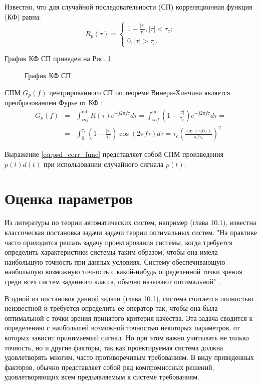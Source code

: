 Известно, что для случайной последовательности (СП) корреляционная функция (КФ) равна:
\begin{equation}
	\label{eq:cdma_ca_corr_func}
	 R_p(\tau) = \begin{cases}
		1 - \frac{|\tau|}{\tau_c}, |\tau| < \tau_c; \\
		0, |\tau| > \tau_c.
		\end{cases}
\end{equation}

График КФ СП приведен на Рис. \ref{pic:cf_code}.
\begin{figure}[h]
	\center{}
	\caption{График КФ СП} 
	\label{pic:cf_code}
\end{figure}

СПМ ${G_p(f)}$ центрированного СП по теореме Винера-Хинчина является преобразованием Фурье
от КФ \cite{borisovBook}:
\begin{align}
	\label{eq:psd_corr_func}
	G_p(f) & = & \int^{\inf}_{inf} R(\tau)e^{-j2\pi f \tau} d\tau = \int^{\inf}_{inf} \left( 1 - \frac{|\tau|}{\tau_c} \right) e^{-j2\pi f \tau} d\tau = \nonumber \\
		& = & \int^{\tau_c}_{0}\left( 1 - \frac{|\tau|}{\tau_c} \right) \cos{(2\pi f \tau)} d\tau = \tau_c \left( \frac{\sin{(\pi f \tau_c)}}{\pi f \tau_c} \right)^2
\end{align}

Выражение \ref{eq:psd_corr_func} представляет собой СПМ произведения ${p(t)d(t)}$ при использовании случайного сигнала ${p(t)}$.

\section{Оценка параметров}
Из литературы по теории автоматических систем, например \cite{pugachev} (глава 10.1), известна классическая постановка
задачи задачи теории оптимальных систем. "На практике часто приходится решать задачу проектирования системы, когда
требуется определить характеристики системы таким образом, чтобы она имела наибольшую точность при данных условиях.
Систему обеспечивающую наибольшую возможную точность с какой-нибудь определенной точки зрения среди всех систем
заданного класса, обычно называют оптимальной" \cite{pugachev}.

В одной из постановок данной задачи \cite{pugachev} (глава 10.1), система считается полностью неизвестной
и требуется определить ее оператор так, чтобы она была оптимальной с точки зрения принятого критерия качества. Эта
задача сводится к определению с наибольшей возможной точностью некоторых параметров, от которых зависит принимаемый
сигнал. Но при этом важно учитывать не только точность, но и другие факторы, так как проектируемая система должна
удовлетворять многим, часто противоречивым требованиям. В виду приведенных факторов, обычно представляет собой
ряд компромиссных решений, удовлетворяющих всем предъявляемым к системе требованиям.


